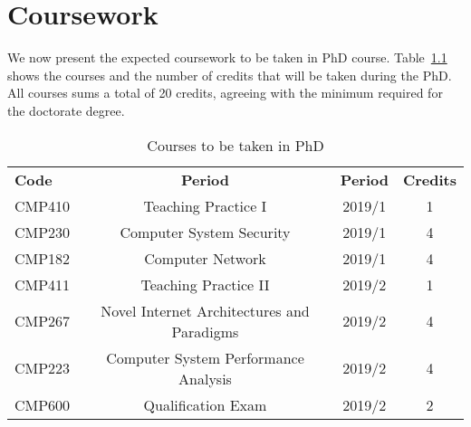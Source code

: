 \chapter{Coursework}\label{cap:coursework}
\thispagestyle{empty}

We now present the expected coursework to be taken in PhD course. Table~\ref{tab:phd-courses} shows the courses and the number of credits that will be taken during the PhD. All courses sums a total of 20 credits, agreeing with the minimum required for the doctorate degree.

\begin{table}[htp]
\centering
\begin{tabularx}{\textwidth}{ l | c | c | c}
\hline
{\bf Code} & {\bf Period} & \textbf{Period} & \textbf{Credits} \\ 
CMP410 & Teaching Practice I & 2019/1 & 1 \\
CMP230 & Computer System Security & 2019/1 & 4 \\
CMP182 & Computer Network & 2019/1 & 4 \\
CMP411 & Teaching Practice II & 2019/2 & 1 \\
CMP267 & Novel Internet Architectures and Paradigms & 2019/2 & 4 \\
CMP223 & Computer System Performance Analysis & 2019/2 & 4 \\
CMP600 & Qualification Exam & 2019/2 & 2 \\

\hline
\end{tabularx}
\caption{Courses to be taken in PhD}
\label{tab:phd-courses}
\end{table}

